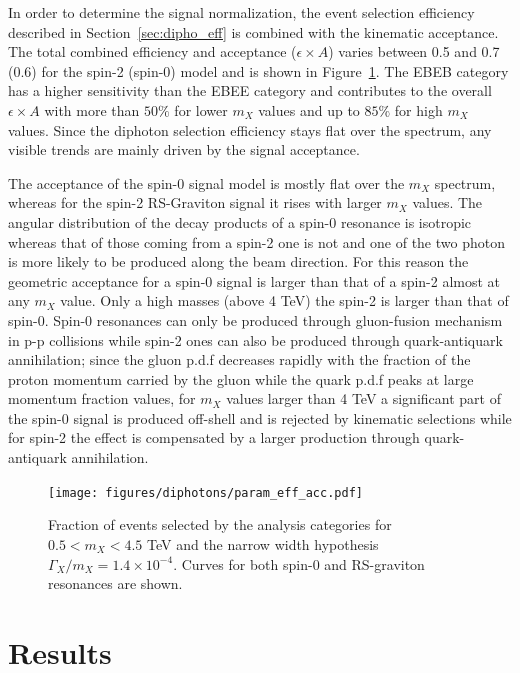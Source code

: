 \clearpage

In order to determine the signal normalization, the event selection efficiency
described in Section~\ref{sec:dipho_eff} is combined with the kinematic acceptance.
The total combined efficiency and acceptance ($\epsilon\times A$)
varies between 0.5 and 0.7 (0.6) for the spin-2 (spin-0) model and is shown in Figure~\ref{fig:eff_times_acc}. The EBEB
category has a higher sensitivity than the EBEE category and contributes to the overall
$\epsilon\times A$ with more than $50\%$ for lower $m_X$ values and up to $85\%$ for high $m_X$ values. Since
the diphoton selection efficiency stays flat over the \mgg spectrum, any
visible trends are mainly driven by the signal acceptance.

The acceptance of the spin-0 signal model is mostly flat over the $m_X$ spectrum,
whereas for the spin-2 RS-Graviton signal it rises with larger $m_X$ values.
The angular distribution of the decay products of a spin-0 resonance is isotropic 
whereas that of those coming from a spin-2 one is not and one of the two photon is more likely
to be produced along the beam direction.
For this reason the geometric acceptance for a spin-0 signal is larger than that of a spin-2
almost at any $m_X$ value. Only a high masses (above 4 TeV) the spin-2 is larger than that of spin-0.
Spin-0 resonances can only be produced through gluon-fusion mechanism in p-p collisions while
spin-2 ones can also be produced through quark-antiquark annihilation; since
the gluon p.d.f decreases rapidly with the fraction of the proton momentum carried by the gluon while 
the quark p.d.f peaks at large momentum fraction values, for $m_X$ values larger than 4 TeV a significant
part of the spin-0 signal is produced off-shell and is rejected by kinematic selections while for spin-2
the effect is compensated by a larger production through quark-antiquark annihilation.

\begin{figure}[!h]
  \centering
  \texttt{[image: figures/diphotons/param\_eff\_acc.pdf]}
  \caption{Fraction of events selected by the analysis categories for
    $0.5 < m_X < 4.5$ TeV and the narrow width hypothesis $\Gamma_X/m_X = 1.4\times 10^{-4}$.
    Curves for both spin-0 and RS-graviton resonances are shown.}
  \label{fig:eff_times_acc}
\end{figure}

\section{Results}
\label{sec:dipho_results}
